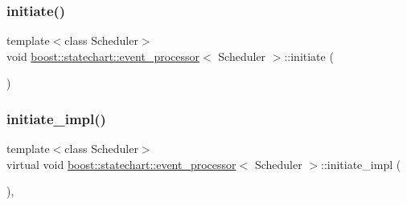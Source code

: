 \subsubsection{\texorpdfstring{initiate()}{initiate()}}
{\footnotesize\ttfamily template$<$class Scheduler$>$ \\
void \mbox{\hyperlink{classboost_1_1statechart_1_1event__processor}{boost\+::statechart\+::event\+\_\+processor}}$<$ Scheduler $>$\+::initiate (\begin{DoxyParamCaption}{ }\end{DoxyParamCaption})\hspace{0.3cm}{\ttfamily [inline]}}

\mbox{\label{classboost_1_1statechart_1_1event__processor_a48a2bfcad66582f6c88e6034b2b838cb}} 
\subsubsection{\texorpdfstring{initiate\+\_\+impl()}{initiate\_impl()}}
{\footnotesize\ttfamily template$<$class Scheduler$>$ \\
virtual void \mbox{\hyperlink{classboost_1_1statechart_1_1event__processor}{boost\+::statechart\+::event\+\_\+processor}}$<$ Scheduler $>$\+::initiate\+\_\+impl (\begin{DoxyParamCaption}{ }\end{DoxyParamCaption})\hspace{0.3cm}{\ttfamily [private]}, {}}



